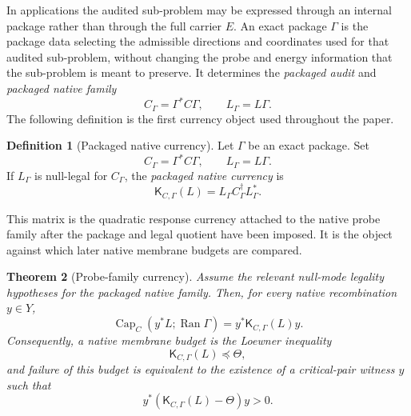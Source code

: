 \documentclass[11pt]{article}
\DeclareMathOperator{\Capacity}{Cap}
\DeclareMathOperator{\Ran}{Ran}
\newcommand{\K}{\mathsf K}
\newcommand{\preceqq}{\preceq}
\newtheorem{theorem}{Theorem}[section]
\theoremstyle{definition}
\newtheorem{definition}[theorem]{Definition}
\begin{document}
In applications the audited sub-problem may be expressed through an
internal package rather than through the full carrier \(E\).  An exact
package \(\Gamma\) is the package data selecting the admissible
directions and coordinates used for that audited sub-problem, without
changing the probe and energy information that the sub-problem is meant
to preserve.  It determines the \emph{packaged audit} and
\emph{packaged native family}
\[
  C_\Gamma=\Gamma^*C\Gamma,\qquad L_\Gamma=L\Gamma.
\]
The following definition is the first currency object used throughout
the paper.

\begin{definition}[Packaged native currency]\label{def:main:packaged-currency}
Let \(\Gamma\) be an exact package.  Set
\[
  C_\Gamma=\Gamma^*C\Gamma,\qquad L_\Gamma=L\Gamma.
\]
If \(L_\Gamma\) is null-legal for \(C_\Gamma\), the
\emph{packaged native currency} is
\[
  \K_{C,\Gamma}(L)=L_\Gamma C_\Gamma^\dagger L_\Gamma^*.
\]
\end{definition}

This matrix is the quadratic response currency attached to the native
probe family after the package and legal quotient have been imposed.
It is the object against which later native membrane budgets are
compared.

\begin{theorem}[Probe-family currency]\label{thm:main:probe-family-currency}
Assume the relevant null-mode legality hypotheses for the packaged
native family.  Then, for every native recombination \(y\in Y\),
\[
  \Capacity_C(y^*L;\Ran\Gamma)=y^*\K_{C,\Gamma}(L)y.
\]
Consequently, a native membrane budget is the Loewner inequality
\[
  \K_{C,\Gamma}(L)\preceqq\Theta,
\]
and failure of this budget is equivalent to the existence of a
critical-pair witness \(y\) such that
\[
  y^*(\K_{C,\Gamma}(L)-\Theta)y>0.
\]
\end{theorem}
\end{document}
